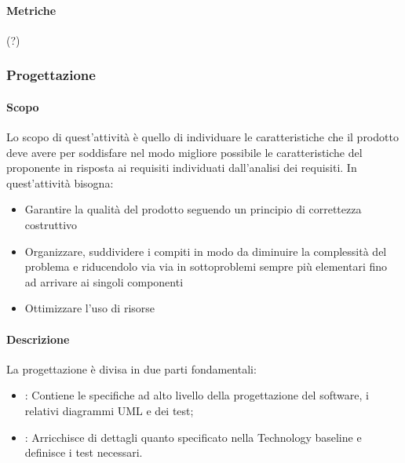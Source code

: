 \documentclass[../norme-di-progetto.tex]{subfiles}
\begin{document}
\paragraph{Metriche}
 (?)
 
 
 \subsubsection{Progettazione}
 
 \paragraph{Scopo}
 Lo scopo di quest'attività è quello di individuare le caratteristiche che il prodotto deve avere per soddisfare nel modo migliore possibile le caratteristiche del proponente in risposta ai requisiti individuati dall'analisi dei requisiti. In quest'attività bisogna:
 \begin{itemize}
     \item Garantire la qualità del prodotto seguendo un principio di correttezza costruttivo
     \item Organizzare, suddividere i compiti in modo da diminuire la complessità del problema e riducendolo via via in sottoproblemi sempre più elementari fino ad arrivare ai singoli componenti
     \item Ottimizzare l'uso di risorse
 \end{itemize}
 
 \paragraph{Descrizione}
 La progettazione è divisa in due parti fondamentali:
 \begin{itemize}
     \item {}: Contiene le specifiche ad alto livello della progettazione del software, i relativi diagrammi UML e dei test;
     \item {}: Arricchisce di dettagli quanto specificato nella Technology baseline e definisce i test necessari.
 \end{itemize}
 
\end{document}
